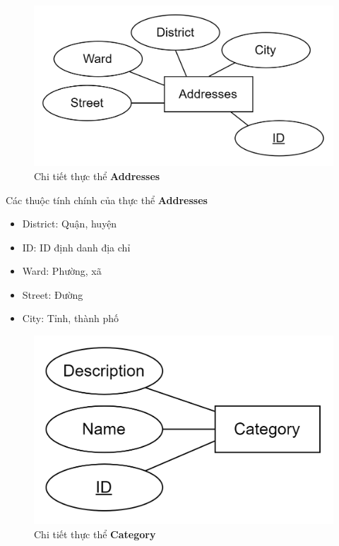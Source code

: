\begin{figure}[h]
    \centering
    \includegraphics[scale = 0.20]{img/db/addresses.png}
    \vspace{1cm}
    \caption{Chi tiết thực thể \textbf{Addresses}}
    \label{fig:taskAssignment}
\end{figure}
Các thuộc tính chính của thực thể \textbf{Addresses}
\begin{itemize}
    \item District: Quận, huyện
    \item ID: ID định danh địa chỉ
    \item Ward: Phường, xã
    \item Street: Đường
    \item City: Tỉnh, thành phố
\end{itemize}

\begin{figure}[h]
    \centering
    \includegraphics[scale = 0.20]{img/db/category.png}
    \vspace{1cm}
    \caption{Chi tiết thực thể \textbf{Category}}
    \label{fig:taskAssignment}
\end{figure}

